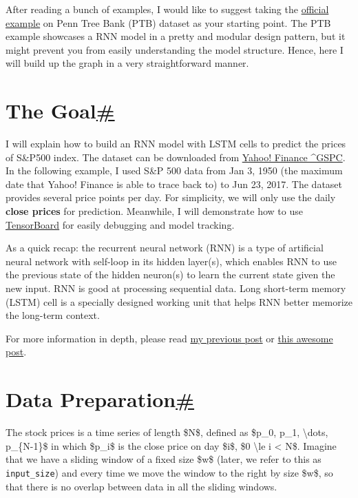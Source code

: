 After reading a bunch of examples, I would like to suggest taking the \href{https://github.com/tensorflow/models/tree/master/tutorials/rnn/ptb}{official example} on Penn Tree Bank (PTB) dataset as your starting point. The PTB example showcases a RNN model in a pretty and modular design pattern, but it might prevent you from easily understanding the model structure. Hence, here I will build up the graph in a very straightforward manner.

\section{\texorpdfstring{The Goal\hyperref[the-goal]{\#}}{The Goal\#}}\label{the-goal}

I will explain how to build an RNN model with LSTM cells to predict the prices of S\&P500 index. The dataset can be downloaded from \href{https://finance.yahoo.com/quote/\%5EGSPC/history?p=\%5EGSPC}{Yahoo! Finance \^{}GSPC}. In the following example, I used S\&P 500 data from Jan 3, 1950 (the maximum date that Yahoo! Finance is able to trace back to) to Jun 23, 2017. The dataset provides several price points per day. For simplicity, we will only use the daily \textbf{close prices} for prediction. Meanwhile, I will demonstrate how to use \href{https://www.tensorflow.org/get_started/summaries_and_tensorboard}{TensorBoard} for easily debugging and model tracking.

As a quick recap: the recurrent neural network (RNN) is a type of artificial neural network with self-loop in its hidden layer(s), which enables RNN to use the previous state of the hidden neuron(s) to learn the current state given the new input. RNN is good at processing sequential data. Long short-term memory (LSTM) cell is a specially designed working unit that helps RNN better memorize the long-term context.

For more information in depth, please read \href{https://lilianweng.github.io/posts/2017-06-21-overview/\#recurrent-neural-network}{my previous post} or \href{http://colah.github.io/posts/2015-08-Understanding-LSTMs/}{this awesome post}.

\section{\texorpdfstring{Data Preparation\hyperref[data-preparation]{\#}}{Data Preparation\#}}\label{data-preparation}

The stock prices is a time series of length \$N\$, defined as \$p\_0, p\_1, \textbackslash dots, p\_\{N-1\}\$ in which \$p\_i\$ is the close price on day \$i\$, \$0 \textbackslash le i \textless{} N\$. Imagine that we have a sliding window of a fixed size \$w\$ (later, we refer to this as \texttt{input\_size}) and every time we move the window to the right by size \$w\$, so that there is no overlap between data in all the sliding windows.

